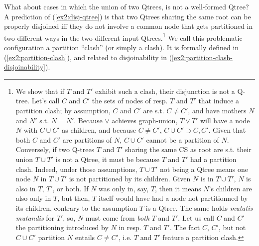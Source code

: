 
What about cases in which the union of two Qtrees, is not a well-formed Qtree? A prediction of (\ref{ex2:disj-qtree}) is that two Qtrees sharing the same root can be properly disjoined iff they do not involve a common node that gets partitioned in two different ways in the two different input Qtrees.\footnote{We show that if $T$ and $T'$ exhibit such a clash, their disjunction is not a Q-tree. Let's call $C$ and $C'$ the sets of nodes of resp. $T$ and $T'$ that induce a partition clash; by assumption, $C$ and $C'$ are s.t. $C\neq C'$, and have mothers $N$ and $N'$ s.t. $N=N'$. Because $\vee$ achieves graph-union, $T\vee T'$ will have a node $N$ with $C\cup C'$ as children, and because $C\neq C'$, $C\cup C' \supset C, C'$. Given that both $C$ and $C'$ are partitions of $N$, $C\cup C'$ cannot be a partition of $N$. Conversely, if two Q-trees $T$ and $T'$ sharing the same CS as root are s.t. their union $T \cup T'$ is not a Qtree, it must be because $T$ and $T'$ had a partition clash. Indeed, under those assumptions, $T \cup T'$ not being a Qtree means one node $N$ in $T \cup T'$ is not partitioned by its children. Given $N$ is in $T \cup T'$, $N$ is also in $T$, $T'$, or both. If $N$ was only in, say, $T$, then it means $N$'s children are also only in $T$, but then, $T$ itself would have had a node not partitionned by its children, contrary to the assumption $T$ is a Qtree. The same holds \textit{mutatis mutandis} for $T'$, so, $N$ must come from \textit{both} $T$ and $T'$. Let us call $C$ and $C'$ the partitioning introduced by $N$ in resp. $T$ and $T'$. The fact $C$, $C'$, but not $C \cup C'$ partition $N$ entails $C\neq C'$, i.e. $T$ and $T'$ feature a partition clash.} We call this problematic configuration a partition ``clash'' (or simply a clash). It is formally defined in (\ref{ex2:partition-clash}), and related to disjoinability in (\ref{ex2:partition-clash-disjoinability}).

\begin{exe}
	\label{ex2:partition-clash}
	\label{ex2:partition-clash-disjoinability}
\end{exe}

